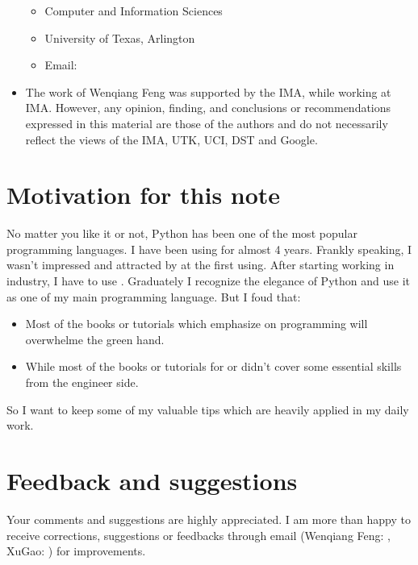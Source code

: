 \documentclass[letterpaper,12pt,english]{sphinxmanual}
\begin{document}
\begin{itemize}
\begin{itemize}
\item {} 
Computer and Information Sciences

\item {} 
University of Texas, Arlington

\item {} 
Email: 

\end{itemize}

\item {} 

The work of Wenqiang Feng was supported by the IMA, while working at IMA. However, any opinion, finding, and conclusions or recommendations expressed in this material are those of the authors and do not necessarily reflect the views of the IMA, UTK, UCI, DST and Google.

\end{itemize}


\section{Motivation for this note}
\label{\detokenize{preface:motivation-for-this-note}}
No matter you like it or not, Python has been one of the most popular programming languages.
I have been using  for almost 4 years. Frankly speaking, I wasn’t impressed and attracted
by  at the first using. After starting working in industry, I have to use . Graduately
I recognize the elegance of Python and use it as one of my main programming language. But I foud that:
\begin{itemize}
\item {} 
Most of the  books or tutorials which emphasize on programming will overwhelme the green hand.

\item {} 
While most of the  books or tutorials for  or  didn’t cover some essential skills from the engineer side.

\end{itemize}

So I want to keep some of my valuable tips which are heavily applied in my daily work.


\section{Feedback and suggestions}
\label{\detokenize{preface:feedback-and-suggestions}}
Your comments and suggestions are highly appreciated. I am more than happy to receive
corrections, suggestions or feedbacks through email (Wenqiang Feng: , XuGao: ) for improvements.
\end{document}
